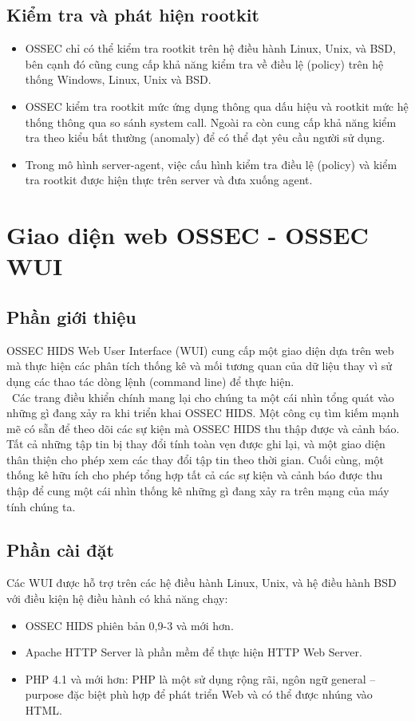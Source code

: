  \subsection{Kiểm tra và phát hiện rootkit}
  \begin{itemize}
    \item OSSEC chỉ có thể kiểm tra rootkit trên hệ điều hành Linux, Unix, và BSD, bên cạnh đó cũng cung cấp khả năng kiểm tra về điều lệ (policy) trên hệ thống Windows, Linux, Unix và BSD.
    \item OSSEC kiểm tra rootkit mức ứng dụng thông qua dấu hiệu và rootkit mức hệ thống thông qua so sánh system call. Ngoài ra còn cung cấp khả năng kiểm tra theo kiểu bất thường (anomaly) để có thể đạt yêu cầu người sử dụng.
    \item Trong mô hình server-agent, việc cấu hình kiểm tra điều lệ (policy) và kiểm tra rootkit được hiện thực trên server và đưa xuống agent.
  \end{itemize}
 \section{Giao diện web OSSEC - OSSEC WUI}
 \subsection{Phần giới thiệu}
 OSSEC HIDS Web User Interface (WUI) cung cấp một giao diện dựa trên web mà thực
 hiện các phân tích thống kê và mối tương quan của dữ liệu thay vì sử dụng các
 thao tác dòng lệnh (command line) để thực hiện.\\\
  Các trang điều khiển chính
 mang lại cho chúng ta một cái nhìn tổng quát vào những gì đang xảy ra khi triển
 khai OSSEC HIDS. Một công cụ tìm kiếm mạnh mẽ có sẵn để theo dõi các sự kiện 
 mà OSSEC HIDS thu thập được và cảnh báo. Tất cả những tập tin bị thay đổi tính
 toàn vẹn được ghi lại, và một giao diện thân thiện cho phép xem các thay đổi
 tập tin theo thời gian. Cuối cùng, một thống kê hữu ích cho phép tổng hợp tất
 cả các sự kiện và cảnh báo được thu thập để cung một cái nhìn thống kê những gì
 đang xảy ra trên mạng của máy tính chúng ta.
 \subsection{Phần cài đặt}
 Các WUI được hỗ trợ trên các hệ điều hành Linux, Unix, và hệ điều hành BSD với
 điều kiện hệ điều hành có khả năng chạy:
 \begin{itemize}
   \item OSSEC HIDS phiên bản 0,9-3 và mới hơn.
   \item Apache HTTP Server là phần mềm để thực hiện HTTP Web Server.
   \item PHP 4.1 và mới hơn:  PHP là một sử dụng rộng rãi, ngôn ngữ general –
   purpose đặc biệt phù hợp để phát triển Web và có thể được nhúng vào HTML.
 \end{itemize}
